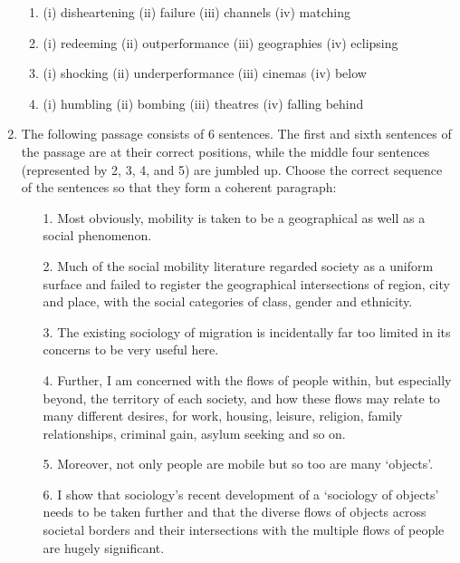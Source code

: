 \documentclass[12pt]{article}
\theoremstyle{remark}
\begin{document}
\begin{enumerate}
\begin{enumerate}
\item (i) disheartening (ii) failure (iii) channels (iv) matching
\item (i) redeeming (ii) outperformance (iii) geographies (iv) eclipsing
\item (i) shocking (ii) underperformance (iii) cinemas (iv) below
\item (i) humbling (ii) bombing (iii) theatres (iv) falling behind
\end{enumerate}
\hfill{}
\item The following passage consists of 6 sentences. The first and sixth sentences of the passage are at their correct positions, while the middle four sentences (represented by 2, 3, 4, and 5) are jumbled up. Choose the correct sequence of the sentences so that they form a coherent paragraph:
\begin{enumerate}
\item[1.] Most obviously, mobility is taken to be a geographical as well as a social phenomenon.
\item[2.] Much of the social mobility literature regarded society as a uniform surface and failed to register the geographical intersections of region, city and place, with the social categories of class, gender and ethnicity.
\item[3.] The existing sociology of migration is incidentally far too limited in its concerns to be very useful here.
\item[4.] Further, I am concerned with the flows of people within, but especially beyond, the territory of each society, and how these flows may relate to many different desires, for work, housing, leisure, religion, family relationships, criminal gain, asylum seeking and so on.
\item[5.] Moreover, not only people are mobile but so too are many ‘objects’.
\item[6.] I show that sociology’s recent development of a ‘sociology of objects’ needs to be taken further and that the diverse flows of objects across societal borders and their intersections with the multiple flows of people are hugely significant.
\end{enumerate}
\begin{enumerate}  \end{enumerate}

\end{enumerate}
\end{document}
